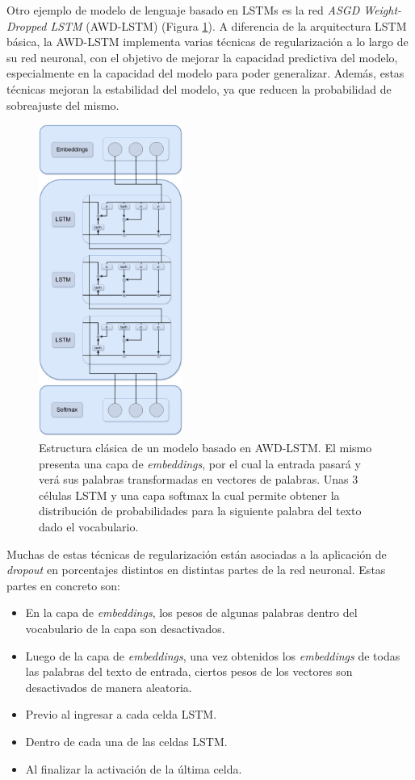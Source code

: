 Otro ejemplo de modelo de lenguaje basado en LSTMs es la red \textit{ASGD Weight-Dropped LSTM} (AWD-LSTM) (Figura \ref{fig:awd-lstm}). A diferencia de la arquitectura LSTM básica, la AWD-LSTM implementa varias técnicas de regularización a lo largo de su red neuronal, con el objetivo de mejorar la capacidad predictiva del modelo, especialmente en la capacidad del modelo para poder generalizar. Además, estas técnicas mejoran la estabilidad del modelo, ya que reducen la probabilidad de sobreajuste del mismo.

\begin{figure}[H]
    \centering
    \includegraphics[width=0.42\textwidth]{imagenes/AWD-LSTM.drawio.png}
    \caption{Estructura clásica de un modelo basado en AWD-LSTM. El mismo presenta una capa de \textit{embeddings}, por el cual la entrada pasará y verá sus palabras transformadas en vectores de palabras. Unas 3 células LSTM y una capa softmax la cual permite obtener la distribución de probabilidades para la siguiente palabra del texto dado el vocabulario.}
    \label{fig:awd-lstm}
\end{figure}

Muchas de estas técnicas de regularización están asociadas a la aplicación de \textit{dropout} en porcentajes distintos en distintas partes de la red neuronal. Estas partes en concreto son:

\begin{itemize}
    \item En la capa de \textit{embeddings}, los pesos de algunas palabras dentro del vocabulario de la capa son desactivados.
    \item Luego de la capa de \textit{embeddings}, una vez obtenidos los \textit{embeddings} de todas las palabras del texto de entrada, ciertos pesos de los vectores son desactivados de manera aleatoria.
    \item Previo al ingresar a cada celda LSTM.
    \item Dentro de cada una de las celdas LSTM.
    \item Al finalizar la activación de la última celda.
\end{itemize}

